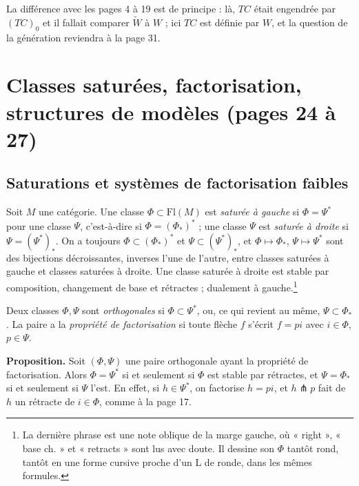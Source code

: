 \documentclass[11pt,a4paper]{article}
\begin{document}

La différence avec les pages 4 à 19 est de principe : là, $TC$ était engendrée
par $(TC)_0$ et il fallait comparer $\widetilde W$ à $W$ ; ici $TC$ est
définie par $W$, et la question de la génération reviendra à la page 31.

\section*{Classes saturées, factorisation, structures de modèles (pages 24 à 27)}

\subsection*{Saturations et systèmes de factorisation faibles}

Soit $M$ une catégorie. Une classe $\Phi \subset \mathrm{Fl}(M)$ est
\emph{saturée à gauche} si $\Phi = \Psi^*$ pour une classe $\Psi$,
c'est-à-dire si $\Phi = (\Phi_*)^*$ ; une classe $\Psi$ est \emph{saturée à
droite} si $\Psi = (\Psi^*)_*$. On a toujours $\Phi \subset (\Phi_*)^*$ et
$\Psi \subset (\Psi^*)_*$, et $\Phi \mapsto \Phi_*$, $\Psi \mapsto \Psi^*$
sont des bijections décroissantes, inverses l'une de l'autre, entre classes
saturées à gauche et classes saturées à droite. Une classe saturée à droite
est stable par composition, changement de base et rétractes ; dualement à
gauche.\footnote{La dernière phrase est une note oblique de la marge gauche,
où « right », « base ch. » et « retracts » sont lus avec doute. Il dessine son
$\Phi$ tantôt rond, tantôt en une forme cursive proche d'un L de ronde, dans
les mêmes formules.}

Deux classes $\Phi, \Psi$ sont \emph{orthogonales} si $\Phi \subset \Psi^*$,
ou, ce qui revient au même, $\Psi \subset \Phi_*$. La paire a la
\emph{propriété de factorisation} si toute flèche $f$ s'écrit $f = pi$ avec
$i \in \Phi$, $p \in \Psi$.

\textbf{Proposition.} Soit $(\Phi, \Psi)$ une paire orthogonale ayant la
propriété de factorisation. Alors $\Phi = \Psi^*$ si et seulement si $\Phi$
est stable par rétractes, et $\Psi = \Phi_*$ si et seulement si $\Psi$ l'est.
En effet, si $h \in \Psi^*$, on factorise $h = pi$, et $h \pitchfork p$ fait
de $h$ un rétracte de $i \in \Phi$, comme à la page 17.
\end{document}
